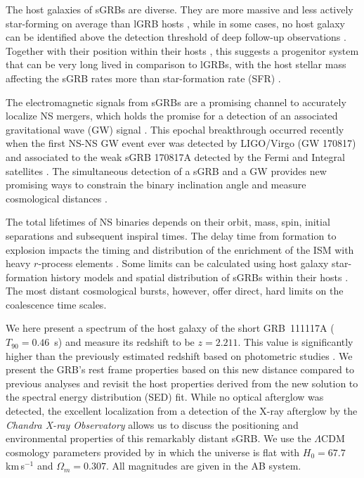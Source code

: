 \documentclass{aa}    %
\begin{document}
The host galaxies of sGRBs are diverse. They are more massive and less actively
star-forming on average than lGRB hosts \citep{Fong2013b}, while in some cases,
no host galaxy can be identified above the detection threshold of deep follow-up
observations \citep{Berger2010a, Tunnicliffe2014}. Together with their position
within their hosts \citep{Fong2013a}, this suggests a progenitor system that can
be very long lived in comparison to lGRBs, with the host stellar mass affecting
the sGRB rates more than star-formation rate (SFR) \citep{Berger2014}.

The electromagnetic signals from sGRBs are a promising channel to accurately
localize NS mergers, which holds the promise for a detection of an associated
gravitational wave (GW) signal \citep{Ghirlanda2016}. This epochal breakthrough
occurred recently when the first NS-NS GW event ever was detected by LIGO/Virgo
(GW 170817) and associated to the weak sGRB 170817A detected by the Fermi and
Integral satellites \citep{LIGOScientificCollaboration2017a, Goldstein2017,
	Savchenko2017}. The simultaneous detection of a sGRB and a GW provides new
promising ways to constrain the binary inclination angle \citep{Arun2014, LIGOScientificCollaboration2017a} and
measure cosmological distances \citep{Nissanke2010, LIGOScientificCollaboration2017c}.

The total lifetimes of NS binaries depends on their orbit, mass, spin, initial
separations and subsequent inspiral times. The delay time from formation to
explosion impacts the timing and distribution of the enrichment of the ISM with
heavy $r$-process elements \citep{VandeVoort2015, Wallner2015,  Ji2016}. Some
limits can be calculated using host galaxy star-formation history models and
spatial distribution of sGRBs within their hosts \citep[][]{Berger2014}. The
most distant cosmological bursts, however, offer direct, hard limits on the
coalescence time scales.

We here present a spectrum of the host galaxy of the short
GRB~111117A ($T_{90}=0.46$~s) and measure its redshift to be $z=2.211$. This
value is significantly higher than the previously estimated redshift based on
photometric studies \citep{Margutti2012,Sakamoto2013}. We present the GRB's rest
frame properties based on this new distance compared to previous analyses and
revisit the host properties derived from the new solution to the spectral energy distribution (SED) fit.
While no optical afterglow was detected, the excellent localization from a
detection of the X-ray afterglow by the \emph{Chandra X-ray Observatory}
allows us to discuss the positioning and environmental properties of this
remarkably distant sGRB.
We use the $\Lambda$CDM cosmology parameters provided by
\citet{Planck2015} in which the universe is flat with $H_0 = 67.7$\,km\,s$^{-1}$
and $\Omega_m = 0.307$. All magnitudes are given in the AB system.
\end{document}
